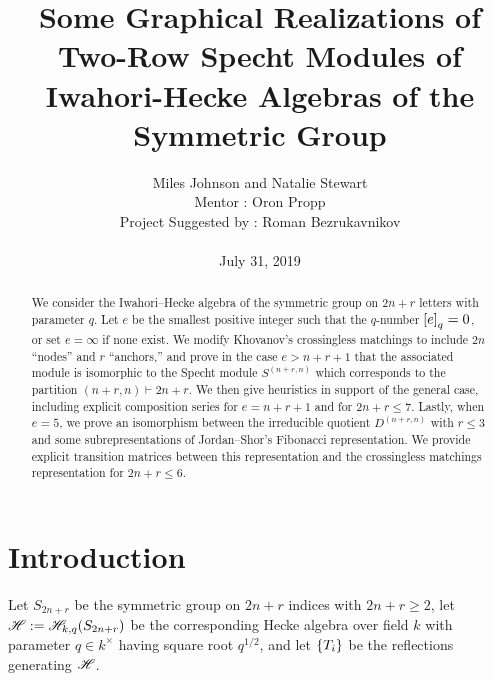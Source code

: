 \documentclass{amsart}
\begin{document}
  \title[Some Graphical Realizations of Two-Row Specht Modules of Hecke Algebras]{Some Graphical Realizations of Two-Row Specht Modules of Iwahori-Hecke Algebras of the Symmetric Group}
  \author[Miles Johnson and Natalie Stewart]{Miles Johnson and Natalie Stewart\\
    Mentor : Oron Propp\\
  Project Suggested by : Roman Bezrukavnikov\\ \; \\
  July 31, 2019
  }

   \begin{titlepage}
    \maketitle
    \begin{abstract}
      We consider the Iwahori--Hecke algebra of the symmetric group on $2n + r$ letters with parameter $q$.
      Let $e$ be the smallest positive integer such that the $q$-number $\left[ e \right]_q = 0$, or set $e = \infty$ if none exist.
      We modify Khovanov's crossingless matchings to include $2n$ ``nodes'' and $r$ ``anchors,'' and prove in the case $e > n + r + 1$ that the associated module is isomorphic to the Specht module $S^{(n+r,n)}$ which corresponds to the partition $(n + r,n) \vdash 2n + r$.
      We then give heuristics in support of the general case, including explicit composition series for $e = n + r + 1$ and for $2n + r \leq 7$. 
      Lastly, when $e = 5$, we prove an isomorphism between the irreducible quotient $D^{(n+r,n)}$ with $r \leq 3$ and some subrepresentations of Jordan--Shor's Fibonacci representation.
      We provide explicit transition matrices between this representation and the crossingless matchings representation for $2n + r \leq 6$.
    \end{abstract}

  \begingroup
  \hypersetup{linkcolor=black} %
  \tableofcontents
  \endgroup

  \end{titlepage}

\section{Introduction} 
  Let $S_{2n+r}$ be the symmetric group on $2n+r$ indices with $2n + r \geq 2$, let $\mathscr{H} := \mathscr{H}_{k,q}(S_{2n+r})$ be the corresponding Hecke algebra over field $k$ with parameter $q \in k^\times$ having square root $q^{1/2}$, and let $\left\{ T_i \right\}$ be the reflections generating $\mathscr{H}$.
  
\end{document}
